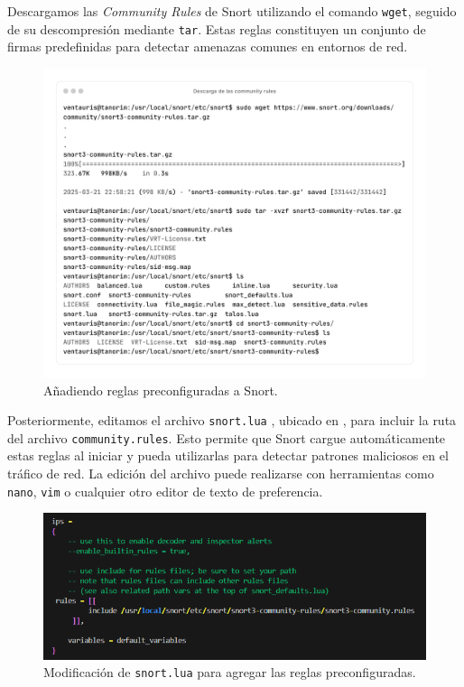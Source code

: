 \documentclass[11pt,a4paper,twoside]{report}
\begin{document}
Descargamos las \textit{Community Rules} de Snort utilizando el comando \texttt{wget}, seguido de su descompresión mediante \texttt{tar}. Estas reglas constituyen un conjunto de firmas predefinidas para detectar amenazas comunes en entornos de red.

\begin{figure}[H]
	\centering
	\includegraphics[scale=0.12]{instalacion_reglas_snort/1-1.png}
	\caption{Añadiendo reglas preconfiguradas a Snort.}
\end{figure}

\pagebreak

Posteriormente, editamos el archivo \texttt{snort.lua} \cite{snort_user_manual}, ubicado en , para incluir la ruta del archivo \texttt{community.rules}. Esto permite que Snort cargue automáticamente estas reglas al iniciar y pueda utilizarlas para detectar patrones maliciosos en el tráfico de red. La edición del archivo puede realizarse con herramientas como \texttt{nano}, \texttt{vim} o cualquier otro editor de texto de preferencia.

\begin{figure}[H]
	\centering
	\includegraphics[scale=0.8]{instalacion_reglas_snort/2.png}
	\caption{Modificación de \texttt{snort.lua} para agregar las reglas preconfiguradas.}
\end{figure}
\end{document}
